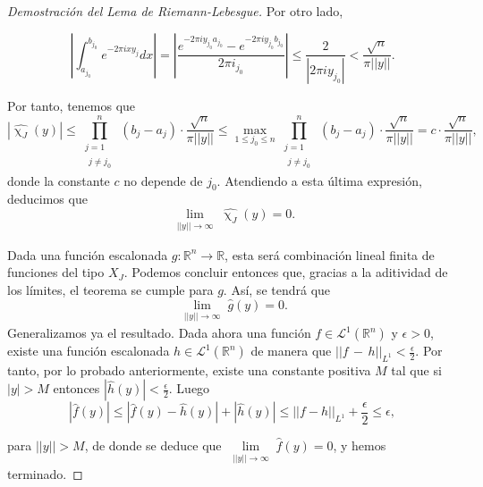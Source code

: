 \begin{proof}[Demostración del Lema de Riemann-Lebesgue]
\noindent Por otro lado, 

\begin{equation}
\left|\int_{a_{j_0}}^{b_{j_0}}  e^{-2 \pi i x y_j}  dx  \right| = \left|\frac{e^{-2 \pi i y_{j_0} a_{j_0} }-e^{-2 \pi i y_{j_0}  b_{j_0} }}{2 \pi i _{j_0} }\right| \leq \frac{2}{|2 \pi i y_{j_0}|} <  \frac{\sqrt{n}}{ \pi ||y||}.
\end{equation}

\noindent Por tanto, tenemos que 
\begin{equation}
|\widehat{\upchi_{J}}(y)| \leq \prod_{\substack{j = 1\\ \substack{j \neq j_0}}}^{n}(b_j-a_j)  \cdot \frac{\sqrt{n}}{ \pi ||y||} \leq \max_{1 \leq j_0 \leq n}\prod_{\substack{j = 1\\ \substack{j \neq j_0}}}^{n}(b_j-a_j)  \cdot \frac{\sqrt{n}}{ \pi ||y||} =  c\cdot \frac{\sqrt{n}}{ \pi ||y||},
\end{equation}
donde la constante $c$ no depende de $j_0$.
Atendiendo a esta última expresión, deducimos que 
\begin{equation}   
\underset{\substack{||y|| \rightarrow \infty}}{\lim}\widehat{\upchi_{J}}(y)=0.
\end{equation}

\noindent Dada una función escalonada $g : \mathbb{R}^n \rightarrow \mathbb{R}$, esta será combinación lineal finita de funciones del tipo $X_J$. Podemos concluir 
entonces que, gracias a la aditividad de los límites, el teorema se cumple para $g$. Así, se tendrá que 
\begin{equation}   
\underset{\substack{||y|| \rightarrow \infty}}{\lim}\widehat{g}(y)=0.
\end{equation}
Generalizamos ya el resultado. Dada ahora una función $f \in \mathscr{L}^1(\mathbb{R}^n)$ y $\epsilon > 0$, existe una función escalonada $h \in  \mathscr{L}^1(\mathbb{R}^n)$  de manera que $||f\,-\,h||_{L^1} < \frac{\epsilon}{2}$. Por tanto, por lo probado anteriormente, existe una constante positiva $M$ tal que si $|y| > M$ entonces $|\widehat{h}(y)| <  \frac{\epsilon}{2}$. Luego 
\begin{equation}
    |\widehat{f}(y)| \leq |\widehat{f}(y)-\widehat{h}(y)|+|\widehat{h}(y)| \leq ||f-h||_{L^1} +\frac{\epsilon}{2} \leq \epsilon,
\end{equation}

\noindent para $||y||> M$, de donde se deduce que $\underset{\substack{||y||\rightarrow \infty}}{\lim}\widehat{f}(y)=0$, y hemos terminado.
\end{proof}


